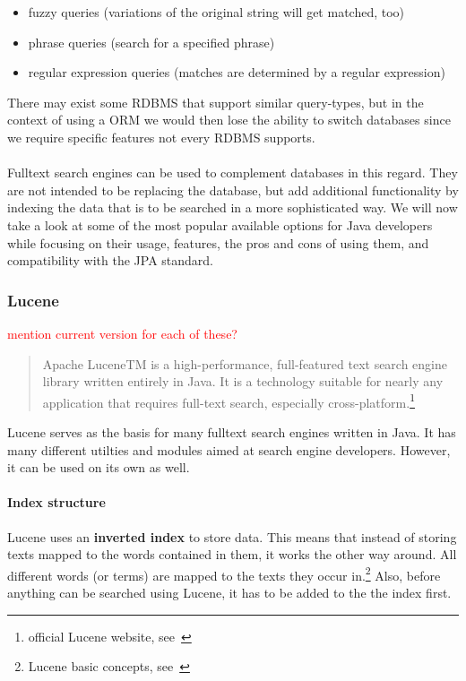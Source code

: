 \begin{itemize}
	\item fuzzy queries (variations of the original string will get matched, too)
	\item phrase queries (search for a specified phrase)
	\item regular expression queries (matches are determined by a regular expression)
\end{itemize}
There may exist some RDBMS that support similar query-types, but in the context of using a ORM we would then lose the ability to switch databases since we require specific features not every RDBMS supports.
\\\\
Fulltext search engines can be used to complement databases in this regard. They are not intended to be replacing the database, but add additional functionality by indexing the data that is to be searched in a more sophisticated way. We will now take a look at some of the most popular available options for Java developers while focusing on their usage, features, the pros and cons of using them, and compatibility with the JPA standard.

\subsubsection{Lucene}

\textcolor{red}{mention current version for each of these?}

\begin{quote}
	Apache LuceneTM is a high-performance, full-featured text search engine library written entirely in Java. It is a technology suitable for nearly any application that requires full-text search, especially cross-platform.\footnote{official Lucene website, see~\cite{lucene_apache_org}}
\end{quote}
Lucene serves as the basis for many fulltext search engines written in Java. It has many different utilties and modules aimed at search engine developers. However, it can be used on its own as well.

\paragraph{Index structure}
Lucene uses an \textbf{inverted index} to store data. This means that instead of storing texts mapped to the words contained in them, it works the other way around. All different words (or terms) are mapped to the texts they occur in.\footnote{Lucene basic concepts, see~\cite{lucene_basic_concepts}} Also, before anything can be searched using Lucene, it has to be added to the the index first.

